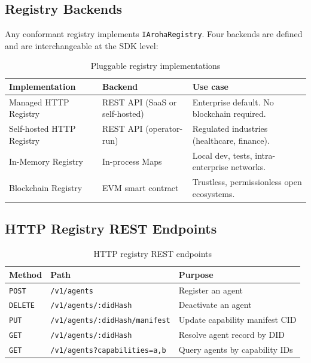 \documentclass[11pt,a4paper]{article}
\begin{document}
\subsection{Registry Backends}

Any conformant registry implements \texttt{IArohaRegistry}. Four backends are
defined and are interchangeable at the SDK level:

\begin{table}[ht]
  \centering
  \renewcommand{\arraystretch}{1.4}
  \begin{tabularx}{\textwidth}{@{} l l X @{}}
    \toprule
    \textbf{Implementation} & \textbf{Backend} & \textbf{Use case} \\
    \midrule
    Managed HTTP Registry     & REST API (SaaS or self-hosted) & Enterprise default. No blockchain required. \\
    Self-hosted HTTP Registry & REST API (operator-run)        & Regulated industries (healthcare, finance). \\
    In-Memory Registry        & In-process Maps                & Local dev, tests, intra-enterprise networks. \\
    Blockchain Registry       & EVM smart contract             & Trustless, permissionless open ecosystems. \\
    \bottomrule
  \end{tabularx}
  \caption{Pluggable registry implementations}
\end{table}

\subsection{HTTP Registry REST Endpoints}

\begin{table}[ht]
  \centering
  \renewcommand{\arraystretch}{1.3}
  \begin{tabularx}{\textwidth}{@{} l l X @{}}
    \toprule
    \textbf{Method} & \textbf{Path} & \textbf{Purpose} \\
    \midrule
    \texttt{POST}   & \texttt{/v1/agents}                   & Register an agent \\
    \texttt{DELETE} & \texttt{/v1/agents/:didHash}          & Deactivate an agent \\
    \texttt{PUT}    & \texttt{/v1/agents/:didHash/manifest} & Update capability manifest CID \\
    \texttt{GET}    & \texttt{/v1/agents/:didHash}          & Resolve agent record by DID \\
    \texttt{GET}    & \texttt{/v1/agents?capabilities=a,b}  & Query agents by capability IDs \\
    \bottomrule
  \end{tabularx}
  \caption{HTTP registry REST endpoints}
\end{table}
\end{document}
